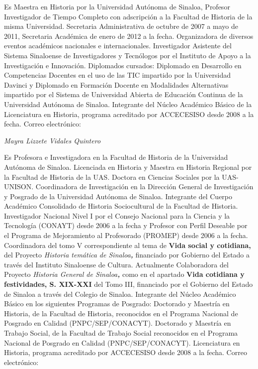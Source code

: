 { 
Es Maestra en Historia por la Universidad Autónoma de Sinaloa,  Profesor
Investigador de Tiempo Completo con adscripción a la Facultad de Historia
de la misma Universidad. Secretaria Administrativa de octubre de 2007 a
mayo de 2011, Secretaria Académica de enero de 2012 a la fecha.
Organizadora de diversos eventos académicos nacionales e internacionales.
Investigador Asistente del Sistema Sinaloense de Investigadores y
Tecnólogos por el Instituto de Apoyo a la Investigación e Innovación.
Diplomados cursados: Diplomado en Desarrollo en Competencias Docentes en el
uso de las TIC impartido por la Universidad Davinci y Diplomado en
Formación Docente en Modalidades Alternativas impartido por el Sistema de
Universidad Abierta de Educación Continua de la Universidad Autónoma de
Sinaloa. Integrante del Núcleo Académico Básico de la Licenciatura en
Historia, programa acreditado por ACCECESISO desde 2008 a la fecha. Correo
electrónico:  
\href{mailto:mega_1845@hotmail.com}{}}


\bigskip

{ 
\textit{Mayra Lizzete Vidales Quintero}}

{ 
Es Profesora e Investigadora en la Facultad de Historia de la Universidad
Autónoma de Sinaloa. Licenciada en Historia y Maestra en Historia Regional
por la Facultad de Historia de la UAS. Doctora en Ciencias Sociales por la
UAS-UNISON. Coordinadora de Investigación en la Dirección General de
Investigación y Posgrado de la Universidad Autónoma de Sinaloa. Integrante
del Cuerpo Académico Consolidado de Historia Sociocultural de la Facultad
de Historia. Investigador Nacional Nivel I por el Consejo Nacional para la
Ciencia y la Tecnología (CONAYT) desde 2006 a la fecha y Profesor con
Perfil Deseable por el Programa de Mejoramiento al Profesorado (PROMEP)
desde 2006 a la fecha. Coordinadora del tomo V\textbf{ }correspondiente al
tema de \textbf{Vida social y cotidiana,} del Proyecto \textit{Historia
temática de Sinaloa}\textbf{\textit{,  }}financiado por  Gobierno del
Estado a través del Instituto Sinaloense de Cultura. Actualmente
Colaboradora\textbf{ }del Proyecto \textit{Historia General de
Sinaloa}\textbf{\textit{, }}como en el apartado \textbf{Vida cotidiana y
festividades, S. XIX-XXI} del Tomo III, financiado por el Gobierno del
Estado de Sinaloa a través del Colegio de Sinaloa. Integrante del Núcleo
Académico Básico en los siguientes Programas de Posgrado: Doctorado y
Maestría en Historia, de la Facultad de Historia, reconocidos en el
Programa Nacional de Posgrado en Calidad (PNPC/SEP/CONACYT). Doctorado y
Maestría en Trabajo Social, de la Facultad de Trabajo Social reconocidos en
el Programa Nacional de Posgrado en Calidad (PNPC/SEP/CONACYT).
Licenciatura en Historia, programa acreditado por ACCECESISO desde 2008 a
la fecha. Correo electrónico: 
\href{mailto:maylivi@uas.edu.mx}{}}


